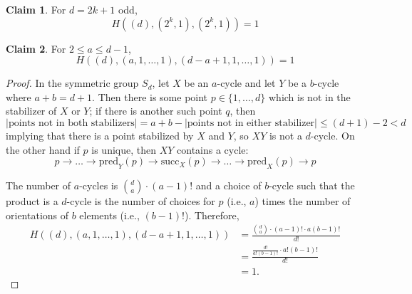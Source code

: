 \documentclass[11pt]{article}           %
\theoremstyle{definition}
\newtheorem{claim}{Claim}[section]
\begin{document}
\begin{claim}
  \label{claim:twosodd}
For $d=2k+1$ odd,
\[
H((d),(2^k,1),(2^{k},1))=1
\]
\end{claim}

\begin{claim}
For $2\leq a\leq d-1$,
\[
H((d),(a,1,\dots,1),(d-a+1,1,\dots,1))=1
\]
\end{claim}
\begin{proof}
  In the symmetric group $S_d$, let $X$ be an $a$-cycle and let
  $Y$ be a $b$-cycle where $a+b=d+1$. Then there is some point
  $p\in\{1,\dots,d\}$ which is not in the stabilizer of $X$ or $Y$;
  if there is another such point $q$, then
  \[
  |\text{points not in both stabilizers}|=a+b-|\text{points not in either stabilizer}|\leq (d+1)-2<d
  \]
  implying that there is a point stabilized by $X$ and $Y$, so $XY$ is not a $d$-cycle. On the other hand
  if $p$ is unique, then
  $XY$ contains a cycle:
  \[
  p\to\dots\to \text{pred}_Y(p)\to\text{succ}_X(p)\to\dots\to\text{pred}_X(p)\to p
  \]
  
  The number of $a$-cycles is $\binom da\cdot (a-1)!$
  and a choice of $b$-cycle such that the product is a $d$-cycle is
  the number of choices for $p$ (i.e., $a$) times the number of orientations
  of $b$ elements (i.e., $(b-1)!$). Therefore,
  \begin{align*}
    H((d),(a,1,\dots,1),(d-a+1,1,\dots,1))&=\frac{\binom da\cdot (a-1)!\cdot a(b-1)!}{d!} \\
    &=\frac{\frac{d!}{a!(b-1)!}\cdot a!(b-1)!}{d!} \\
    &=1.
  \end{align*}
  \end{proof}
\end{document}
